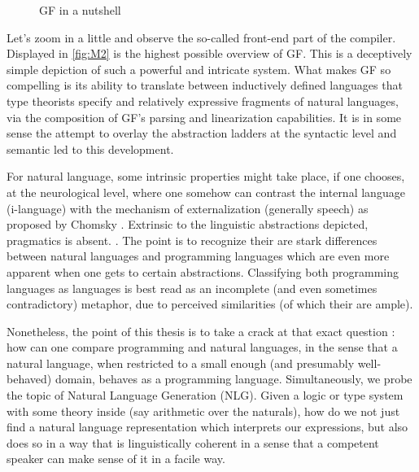 \begin{figure}
\centering
{}
\caption{GF in a nutshell} \label{fig:M2}
\end{figure}

Let's zoom in a little and observe the so-called front-end part of the compiler.
Displayed in \autoref{fig:M2} is the highest possible overview of GF. This is a
deceptively simple depiction of such a powerful and intricate system. What makes
GF so compelling is its ability to translate between inductively defined
languages that type theorists specify and relatively expressive fragments of
natural languages, via the composition of GF's parsing and linearization
capabilities. It is in some sense the attempt to overlay the abstraction ladders
at the syntactic level and semantic led to this development.

For natural language, some intrinsic properties might take place, if one
chooses, at the neurological level, where one somehow can contrast the internal
language (i-language) with the mechanism of externalization (generally speech) as proposed by
Chomsky \cite{Chomsky1995}. Extrinsic to the linguistic abstractions depicted, pragmatics is
absent.
.
The point is to recognize their are stark differences between natural languages
and programming languages which are even more apparent when one gets to certain
abstractions. Classifying both programming languages as
languages is best read as an incomplete (and even sometimes contradictory)
metaphor, due to perceived similarities (of which their are ample).

Nonetheless, the point of this thesis is to take a crack at that exact question
: how can one compare programming and natural languages, in the sense that a
natural language, when restricted to a small enough (and presumably
well-behaved) domain, behaves as a programming language. Simultaneously, we
probe the topic of Natural Language Generation (NLG). Given a
logic or type system with some theory inside (say arithmetic over the naturals),
how do we not just find a natural language representation which interprets our
expressions, but also does so in a way that is linguistically coherent in a
sense that a competent speaker can make sense of it in a facile way.

